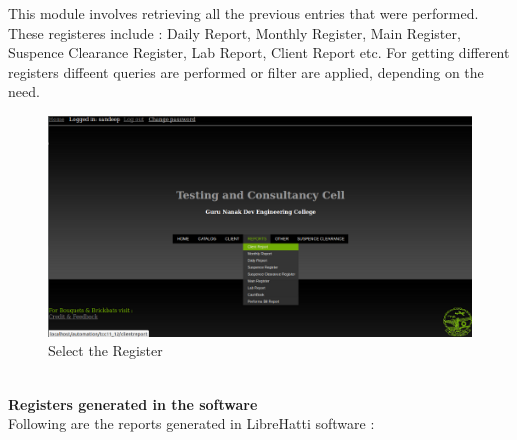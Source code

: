This module involves retrieving all the previous entries that were 
performed. These registeres include : Daily Report, Monthly Register, 
Main Register, Suspence Clearance Register, Lab Report, Client Report 
etc. For getting different registers diffeent queries are performed or 
filter are applied, depending on the need.\\
\begin{figure}[h]
\centering \includegraphics[scale=1.0]{images/registers.png}
\caption{Select the Register}
\end{figure}\\
{\bf Registers generated in the software}\\
Following are the reports generated in LibreHatti software :
